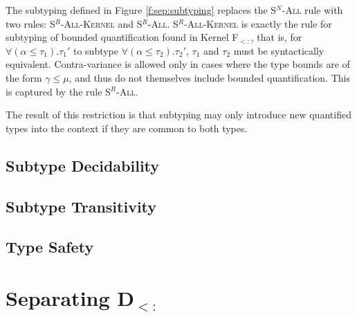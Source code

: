 \documentclass[runningheads]{llncs}
\begin{document}
The subtyping defined in Figure \ref{f:sep:subtyping} replaces the \textsc{S$^N$-All} rule with two rules: \textsc{S$^R$-All-Kernel} and \textsc{S$^R$-All}. 
\textsc{S$^R$-All-Kernel} is exactly the rule for subtyping of bounded quantification found in Kernel F$_{<:}$, that is, 
for $\forall(\alpha \leqslant \tau_1).\tau_1'$ to subtype $\forall(\alpha \leqslant \tau_2).\tau_2'$, $\tau_1$ and $\tau_2$ must be syntactically equivalent.
Contra-variance is allowed only in cases where the type bounds are of the form $\gamma \leqslant \mu$, and thus do not themselves include bounded quantification.
This is captured by the rule \textsc{S$^R$-All}.

The result of this restriction is that subtyping may only introduce new quantified types into the context if they are common to both types.

\subsection{Subtype Decidability}

\subsection{Subtype Transitivity}

\subsection{Type Safety}




%
%
%
%
%

\section{Separating D$_{<:}$}
\end{document}
